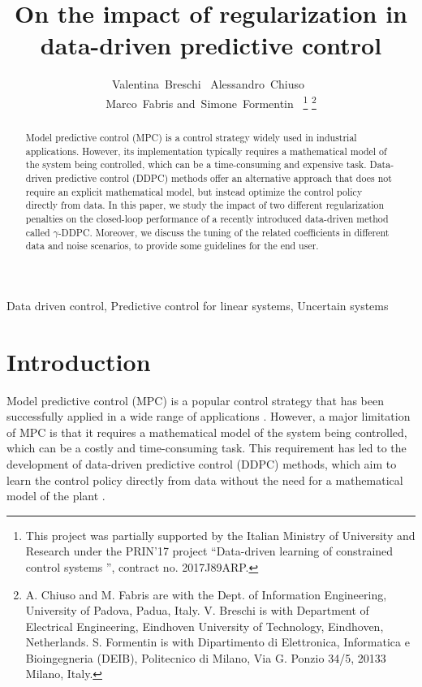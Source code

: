 \documentclass[letterpaper, 10 pt, conference]{ieeeconf}  %
\title{\LARGE \bf On the impact of regularization in data-driven predictive control}
\author{Valentina~Breschi~\IEEEmembership{Member,~IEEE,} Alessandro~Chiuso~\IEEEmembership{Fellow,~IEEE,}\\ Marco~Fabris and~Simone~Formentin~\IEEEmembership{Member,~IEEE,}
\thanks{This project was partially supported by the Italian Ministry of University and Research under the PRIN'17 project \textquotedblleft Data-driven learning of constrained control systems \textquotedblright, contract no. 2017J89ARP.}
	\thanks{A. Chiuso and M. Fabris are with the Dept. of Information Engineering, University of Padova, Padua, Italy.
	V. Breschi is with Department of Electrical Engineering, Eindhoven University of Technology, Eindhoven, Netherlands.
	S. Formentin is with Dipartimento di Elettronica, Informatica e Bioingegneria (DEIB), Politecnico di Milano, Via G. Ponzio 34/5, 20133 Milano, Italy.
}
}
\begin{document}
	
\maketitle
\thispagestyle{empty}
\pagestyle{empty}


\begin{abstract}
Model predictive control (MPC) is a control strategy widely used in industrial applications. However, its implementation typically requires a mathematical model of the system being controlled, which can be a time-consuming and expensive task. Data-driven predictive control (DDPC) methods offer an alternative approach that does not require an explicit mathematical model, but instead optimize the control policy directly from data. In this paper, we study the impact of two different regularization penalties on the closed-loop performance of a recently introduced data-driven method called $\gamma$-DDPC. Moreover, we discuss the tuning of the related coefficients in different data and noise scenarios, to provide some guidelines for the end user.
	
\end{abstract}

\begin{keywords}
  Data driven control, Predictive control for linear systems, Uncertain systems
\end{keywords}
	
	

\section{Introduction} 
\label{sec:intro}
Model predictive control (MPC) is a popular control strategy that has been successfully applied in a wide range of applications \cite{borrelli2017predictive}. However, a major limitation of MPC is that it requires a mathematical model of the system being controlled, which can be a costly and time-consuming task. This requirement has led to the development of data-driven predictive control (DDPC) methods, which aim to learn the control policy directly from data without the need for a mathematical model of the plant \cite{berberich2020data,breschi2022design,sassella2022data}.
\end{document}
